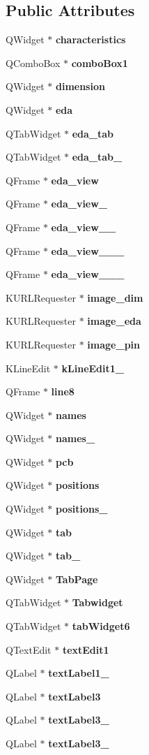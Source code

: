 \subsection*{Public Attributes}
\begin{CompactItemize}
\item 
QWidget $\ast$ {\bf characteristics}
\item 
QCombo\-Box $\ast$ {\bf combo\-Box1}
\item 
QWidget $\ast$ {\bf dimension}
\item 
QWidget $\ast$ {\bf eda}
\item 
QTab\-Widget $\ast$ {\bf eda\_\-tab}
\item 
QTab\-Widget $\ast$ {\bf eda\_\-tab\_}
\item 
QFrame $\ast$ {\bf eda\_\-view}
\item 
QFrame $\ast$ {\bf eda\_\-view\_}
\item 
QFrame $\ast$ {\bf eda\_\-view\_\_}
\item 
QFrame $\ast$ {\bf eda\_\-view\_\_\_}
\item 
QFrame $\ast$ {\bf eda\_\-view\_\_\_}
\item 
KURLRequester $\ast$ {\bf image\_\-dim}
\item 
KURLRequester $\ast$ {\bf image\_\-eda}
\item 
KURLRequester $\ast$ {\bf image\_\-pin}
\item 
KLine\-Edit $\ast$ {\bf k\-Line\-Edit1\_}
\item 
QFrame $\ast$ {\bf line8}
\item 
QWidget $\ast$ {\bf names}
\item 
QWidget $\ast$ {\bf names\_}
\item 
QWidget $\ast$ {\bf pcb}
\item 
QWidget $\ast$ {\bf positions}
\item 
QWidget $\ast$ {\bf positions\_}
\item 
QWidget $\ast$ {\bf tab}
\item 
QWidget $\ast$ {\bf tab\_}
\item 
QWidget $\ast$ {\bf Tab\-Page}
\item 
QTab\-Widget $\ast$ {\bf Tabwidget}
\item 
QTab\-Widget $\ast$ {\bf tab\-Widget6}
\item 
QText\-Edit $\ast$ {\bf text\-Edit1}
\item 
QLabel $\ast$ {\bf text\-Label1\_}
\item 
QLabel $\ast$ {\bf text\-Label3}
\item 
QLabel $\ast$ {\bf text\-Label3\_}
\item 
QLabel $\ast$ {\bf text\-Label3\_}
\end{CompactItemize}
